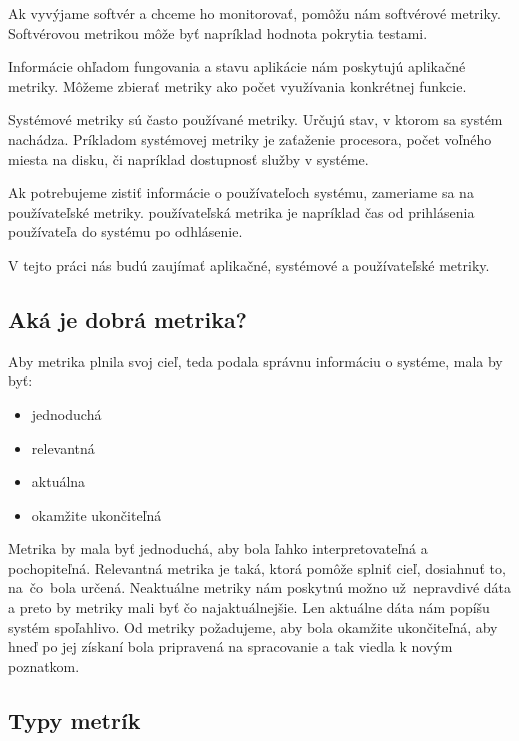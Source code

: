 \documentclass[a4paper, upjsfrontpage, disablespecwarning, thesismargins, thesislinespacing]{rnthesis}
\begin{document}
Ak vyvýjame softvér a chceme ho monitorovať, pomôžu nám softvérové metriky.
Softvérovou metrikou môže byť napríklad hodnota pokrytia testami.

Informácie ohľadom fungovania a stavu aplikácie nám poskytujú aplikačné metriky.
Môžeme zbierať metriky ako počet využívania konkrétnej funkcie.

Systémové metriky sú často používané metriky.
Určujú stav, v ktorom sa systém nachádza.
Príkladom systémovej metriky je zaťaženie procesora, počet voľného miesta na disku, či napríklad dostupnosť služby v systéme.

Ak potrebujeme zistiť informácie o používateľoch systému, zameriame sa na používateľské metriky.
používateľská metrika je napríklad čas od prihlásenia používateľa do systému po odhlásenie.

V tejto práci nás budú zaujímať aplikačné, systémové a používateľské metriky.

\subsection{Aká je dobrá metrika?}

Aby metrika plnila svoj cieľ, teda podala správnu informáciu o systéme, mala by byť:
\begin{itemize}
	\item jednoduchá
	\item relevantná
	\item aktuálna
	\item okamžite ukončiteľná
\end{itemize}

Metrika by mala byť jednoduchá, aby bola ľahko interpretovateľná a pochopiteľná.
Relevantná metrika je taká, ktorá pomôže splniť cieľ, dosiahnuť to, na~čo~bola určená.
Neaktuálne metriky nám poskytnú možno už~nep\-ravdivé dáta a preto by metriky mali byť čo najaktuálnejšie. 
Len aktuálne dáta nám popíšu systém spoľahlivo.
Od metriky požadujeme, aby bola okamžite ukončiteľná, aby hneď po jej získaní bola pripravená na spracovanie a tak viedla k novým poznatkom.
\cite{4}

\subsection{Typy metrík}
\end{document}
